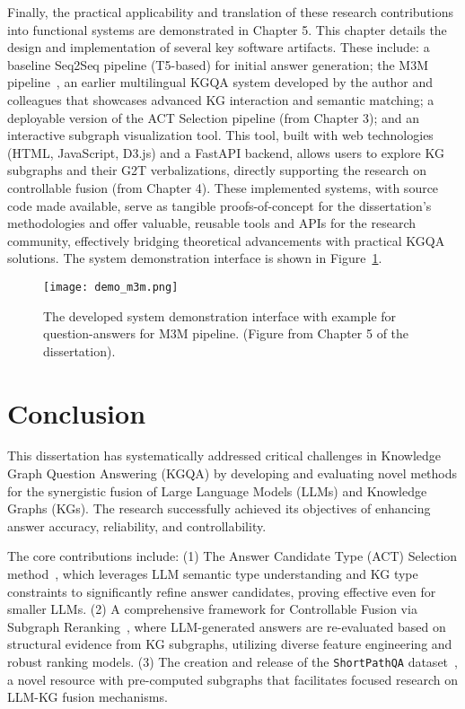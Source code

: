Finally, the practical applicability and translation of these research contributions into functional systems are demonstrated in Chapter 5. This chapter details the design and implementation of several key software artifacts. These include: a baseline Seq2Seq pipeline (T5-based) for initial answer generation; the M3M pipeline~\cite{DBLP:conf/acl/RazzhigaevSMBP23}, an earlier multilingual KGQA system developed by the author and colleagues that showcases advanced KG interaction and semantic matching; a deployable version of the ACT Selection pipeline (from Chapter 3); and an interactive subgraph visualization tool. This tool, built with web technologies (HTML, JavaScript, D3.js) and a FastAPI backend, allows users to explore KG subgraphs and their G2T verbalizations, directly supporting the research on controllable fusion (from Chapter 4). These implemented systems, with source code made available, serve as tangible proofs-of-concept for the dissertation's methodologies and offer valuable, reusable tools and APIs for the research community, effectively bridging theoretical advancements with practical KGQA solutions. The system demonstration interface is shown in Figure~\ref{fig:synopsis:m3m_demo}.

\begin{figure}[htb]
    \centering
    \texttt{[image: demo\_m3m.png]}
    \caption{The developed system demonstration interface with example for question-answers for M3M pipeline. (Figure from Chapter 5 of the dissertation).}
    \label{fig:synopsis:m3m_demo}
\end{figure}


\section*{Conclusion}
\label{sec:synopsis:conclusion}
This dissertation has systematically addressed critical challenges in Knowledge Graph Question Answering (KGQA) by developing and evaluating novel methods for the synergistic fusion of Large Language Models (LLMs) and Knowledge Graphs (KGs). The research successfully achieved its objectives of enhancing answer accuracy, reliability, and controllability.

The core contributions include: (1) The Answer Candidate Type (ACT) Selection method~\cite{DBLP:journals/corr/abs-2310-07008}, which leverages LLM semantic type understanding and KG type constraints to significantly refine answer candidates, proving effective even for smaller LLMs. (2) A comprehensive framework for Controllable Fusion via Subgraph Reranking~\cite{DBLP:journals/corr/abs-2310-02166}, where LLM-generated answers are re-evaluated based on structural evidence from KG subgraphs, utilizing diverse feature engineering and robust ranking models. (3) The creation and release of the \texttt{ShortPathQA} dataset~\cite{DBLP:conf/nldb/SalnikovSPQA25}, a novel resource with pre-computed subgraphs that facilitates focused research on LLM-KG fusion mechanisms.

